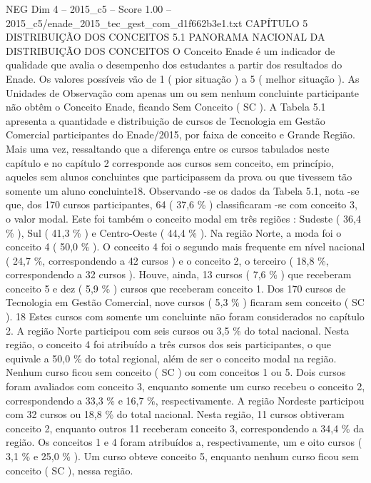 \begin{textsample}{NEG Dim 4 – 2015\_c5 – Score 1.00 – 2015\_c5/enade\_2015\_tec\_gest\_com\_d1f662b3e1.txt}  \label{ex:f4_neg_179}
CAPÍTULO 5 DISTRIBUIÇÃO DOS CONCEITOS 5.1 PANORAMA NACIONAL DA DISTRIBUIÇÃO DOS CONCEITOS O Conceito Enade é um indicador de qualidade que avalia o desempenho dos estudantes a partir dos resultados do Enade.
Os valores possíveis vão de 1 ( pior situação ) a 5 ( melhor situação ).
As Unidades de Observação com apenas um ou sem nenhum concluinte participante não obtêm o Conceito Enade, ficando Sem Conceito ( SC ).
A Tabela 5.1 apresenta a quantidade e distribuição de cursos de Tecnologia em Gestão Comercial participantes do Enade/2015, por faixa de conceito e Grande Região.
Mais uma vez, ressaltando que a diferença entre os cursos tabulados neste capítulo e no capítulo 2 corresponde aos cursos sem conceito, em princípio, aqueles sem alunos concluintes que participassem da prova ou que tivessem tão somente um aluno concluinte18.
Observando -se os dados da Tabela 5.1, nota -se que, dos 170 cursos participantes, 64 ( 37,6 \% ) classificaram -se com conceito 3, o valor modal.
Este foi também o conceito modal em três regiões : Sudeste ( 36,4 \% ), Sul ( 41,3 \% ) e Centro-Oeste ( 44,4 \% ).
Na região Norte, a moda foi o conceito 4 ( 50,0 \% ).
O conceito 4 foi o segundo mais frequente em nível nacional ( 24,7 \%, correspondendo a 42 cursos ) e o conceito 2, o terceiro ( 18,8 \%, correspondendo a 32 cursos ).
Houve, ainda, 13 cursos ( 7,6 \% ) que receberam conceito 5 e dez ( 5,9 \% ) cursos que receberam conceito 1.
Dos 170 cursos de Tecnologia em Gestão Comercial, nove cursos ( 5,3 \% ) ficaram sem conceito ( SC ). 18 Estes cursos com somente um concluinte não foram considerados no capítulo 2.
A região Norte participou com seis cursos ou 3,5 \% do total nacional.
Nesta região, o conceito 4 foi atribuído a três cursos dos seis participantes, o que equivale a 50,0 \% do total regional, além de ser o conceito modal na região.
Nenhum curso ficou sem conceito ( SC ) ou com conceitos 1 ou 5.
Dois cursos foram avaliados com conceito 3, enquanto somente um curso recebeu o conceito 2, correspondendo a 33,3 \% e 16,7 \%, respectivamente.
A região Nordeste participou com 32 cursos ou 18,8 \% do total nacional.
Nesta região, 11 cursos obtiveram conceito 2, enquanto outros 11 receberam conceito 3, correspondendo a 34,4 \% da região.
Os conceitos 1 e 4 foram atribuídos a, respectivamente, um e oito cursos ( 3,1 \% e 25,0 \% ).
Um curso obteve conceito 5, enquanto nenhum curso ficou sem conceito ( SC ), nessa região.

\end{textsample}
